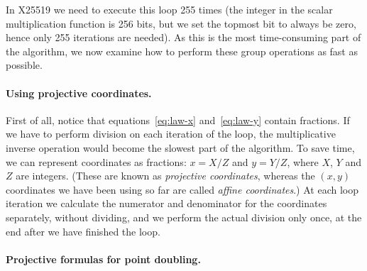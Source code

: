 \documentclass[manuscript]{acmart}
\begin{document}
In X25519 we need to execute this loop 255 times (the integer in the scalar multiplication function is 256 bits, but we set the topmost bit to always be zero, hence only 255 iterations are needed).
As this is the most time-consuming part of the algorithm, we now examine how to perform these group operations as fast as possible.

\paragraph{Using projective coordinates.}

First of all, notice that equations~\eqref{eq:law-x} and~\eqref{eq:law-y} contain fractions.
If we have to perform division on each iteration of the loop, the multiplicative inverse operation would become the slowest part of the algorithm.
To save time, we can represent coordinates as fractions: $x = X/Z$ and $y = Y/Z$, where $X$, $Y$ and $Z$ are integers.
(These are known as \emph{projective coordinates}, whereas the $(x, y)$ coordinates we have been using so far are called \emph{affine coordinates}.)
At each loop iteration we calculate the numerator and denominator for the coordinates separately, without dividing, and we perform the actual division only once, at the end after we have finished the loop.

\paragraph{Projective formulas for point doubling.}
\end{document}

